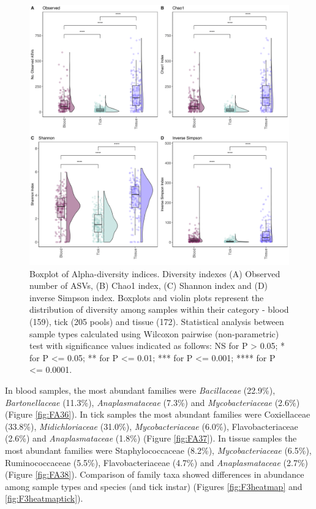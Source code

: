 \documentclass[a4paper, nobind]{templates/ociamthesis}
\begin{document}
\begin{figure}
\includegraphics[width=0.95\linewidth]{figures/ms-figs/Ch3-alphadiv} \caption[Alpha diversity of microbiome community for wildlife blood, tissue and ticks.]{Boxplot of Alpha-diversity indices. Diversity indexes (A) Observed number of ASVs, (B) Chao1 index, (C) Shannon index and (D) inverse Simpson index. Boxplots and violin plots represent the distribution of diversity among samples within their category - blood (159), tick (205 pools) and tissue (172). Statistical analysis between sample types calculated using Wilcoxon pairwise (non-parametric) test with significance values indicated as follows: NS for P > 0.05; * for P <= 0.05; ** for P <= 0.01; *** for P <= 0.001; **** for P <= 0.0001.}\label{fig:F3alpha}
\end{figure}

In blood samples, the most abundant families were \emph{Bacillaceae} (22.9\%), \emph{Bartonellaceae} (11.3\%), \emph{Anaplasmataceae} (7.3\%) and \emph{Mycobacteriaceae} (2.6\%) (Figure \ref{fig:FA36}).
In tick samples the most abundant families were Coxiellaceae (33.8\%), \emph{Midichloriaceae} (31.0\%), \emph{Mycobacteriaceae} (6.0\%), Flavobacteriaceae (2.6\%) and \emph{Anaplasmataceae} (1.8\%) (Figure \ref{fig:FA37}).
In tissue samples the most abundant families were Staphylococcaceae (8.2\%), \emph{Mycobacteriaceae} (6.5\%), Ruminococcaceae (5.5\%), Flavobacteriaceae (4.7\%) and \emph{Anaplasmataceae} (2.7\%) (Figure \ref{fig:FA38}).
Comparison of family taxa showed differences in abundance among sample types and species (and tick instar) (Figures \ref{fig:F3heatmap} and \ref{fig:F3heatmaptick}).
\end{document}
